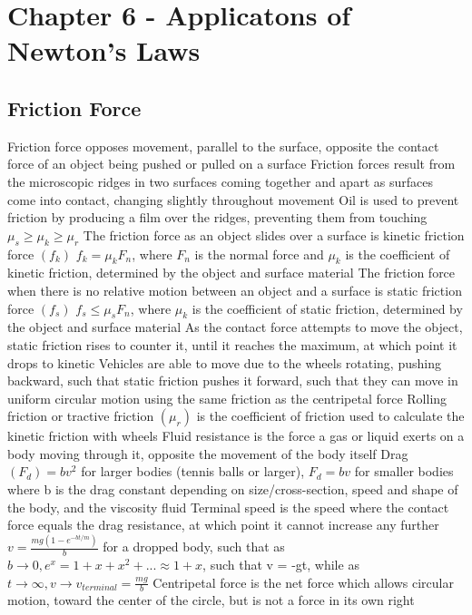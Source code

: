 \documentclass[11 pt, twoside]{article}
\newenvironment{outline*}
{
	\begin{outline}[enumerate]
	}
	{\end{outline}
}
\begin{document}
\section{Chapter 6 - Applicatons of Newton's Laws}
\subsection{Friction Force}
\begin{outline*}
\1 Friction force opposes movement, parallel to the surface, opposite the contact force of an object being pushed or pulled on a surface
\2 Friction forces result from the microscopic ridges in two surfaces coming together and apart as surfaces come into contact, changing slightly throughout movement
\2 Oil is used to prevent friction by producing a film over the ridges, preventing them from touching
\2 $\mu_s \geq \mu_k \geq \mu_r$
\1 The friction force as an object slides over a surface is kinetic friction force $(f_k)$
\2 $f_k = \mu_kF_n$, where $F_n$ is the normal force and $\mu_k$ is the coefficient of kinetic friction, determined by the object and surface material
\1 The friction force when there is no relative motion between an object and a surface is static friction force $(f_s)$
\2 $f_s \leq \mu_sF_n$, where $\mu_k$ is the coefficient of static friction, determined by the object and surface material
\2 As the contact force attempts to move the object, static friction rises to counter it, until it reaches the maximum, at which point it drops to kinetic
\2 Vehicles are able to move due to the wheels rotating, pushing backward, such that static friction pushes it forward, such that they can move in uniform circular motion using the same friction as the centripetal force
\1 Rolling friction or tractive friction $(\mu_r)$ is the coefficient of friction used to calculate the kinetic friction with wheels
\1 Fluid resistance is the force a gas or liquid exerts on a body moving through it, opposite the movement of the body itself
\2 Drag $(F_d) = bv^2$ for larger bodies (tennis balls or larger), $F_d = bv$ for smaller bodies where b is the drag constant depending on size/cross-section, speed and shape of the body, and the viscosity fluid
\2 Terminal speed is the speed where the contact force equals the drag resistance, at which point it cannot increase any further
\2 $v = \frac{mg(1 - e^{-bt/m})}{b}$ for a dropped body, such that as $b \to 0, e^x = 1 + x + x^2 +... \approx 1 + x$, such that v = -gt, while as $t \to \infty, v \to v_{terminal} = \frac{mg}{b}$
\1 Centripetal force is the net force which allows circular motion, toward the center of the circle, but is not a force in its own right
\end{outline*}
\end{document}
